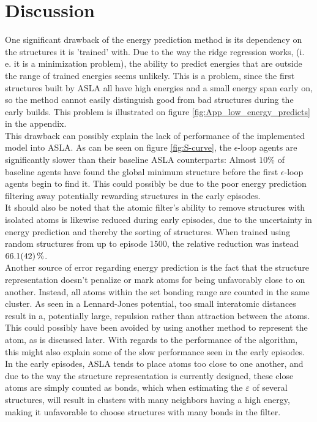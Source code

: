 \chapter{Discussion}

One significant drawback of the energy prediction method is its dependency on the structures it is 'trained' with. Due to the way the ridge regression works, (i. e. it is a minimization problem), the ability to predict energies that are outside the range of trained energies seems unlikely. This is a problem, since the first structures built by ASLA all have high energies and a small energy span early on, so the method cannot easily distinguish good from bad structures during the early builds. This problem is illustrated on figure \ref{fig:App_low_energy_predicts} in the appendix. \\

This drawback can possibly explain the lack of performance of the implemented model into ASLA. As can be seen on figure \ref{fig:S-curve}, the $\epsilon$-loop agents are significantly slower than their baseline ASLA counterparts: Almost $10\%$ of baseline agents have found the global minimum structure before the first $\epsilon$-loop agents begin to find it. This could possibly be due to the poor energy prediction filtering away potentially rewarding structures in the early episodes.\\

It should also be noted that the atomic filter's ability to remove structures with isolated atoms is likewise reduced during early episodes, due to the uncertainty in energy prediction and thereby the sorting of structures. When trained using random structures from up to episode 1500, the relative reduction was instead $\SI{66.1 \pm 4.2}{\percent}$. \\

Another source of error regarding energy prediction is the fact that the structure representation doesn't penalize or mark atoms for being unfavorably close to on another. Instead, all atoms within the set bonding range are counted in the same cluster. As seen in a Lennard-Jones potential, too small interatomic distances result in a, potentially large, repulsion rather than attraction between the atoms. This could possibly have been avoided by using another method to represent the atom, as is discussed later. With regards to the performance of the algorithm, this might also explain some of the slow performance seen in the early episodes. In the early episodes, ASLA tends to place atoms too close to one another, and due to the way the structure representation is currently designed, these close atoms are simply counted as bonds, which when estimating the $\varepsilon$ of several structures, will result in clusters with many neighbors having a high energy, making it unfavorable to choose structures with many bonds in the filter.\\

